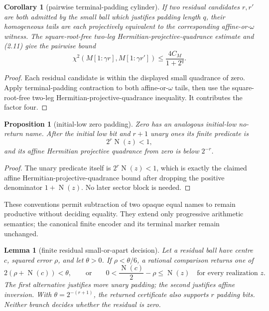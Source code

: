 \documentclass[10pt]{article}
\newtheorem{lemma}[theorem]{Lemma}
\newtheorem{proposition}[theorem]{Proposition}
\newtheorem{corollary}[theorem]{Corollary}
\theoremstyle{definition}
\theoremstyle{remark}
\newcommand{\Norm}{\operatorname{N}}
\newcommand{\Proj}[2]{[#1:#2]}
\begin{document}
\begin{corollary}[pairwise terminal-padding cylinder]
If two residual candidates $r,r'$ are both admitted by the small
ball which justifies padding length $q$, their homogeneous tails are each
projectively equivalent to the corresponding affine-or-$\omega$ witness.
The square-root-free two-leg Hermitian-projective-quadrance estimate and
(2.11) give the pairwise
bound
\[
 \chi^2\!\left(M\Proj{1}{\gamma r},
                 M\Proj{1}{\gamma r'}\right)
 \le \frac{4C_M}{1+2^q}.
\tag{2.11a}
\]
\end{corollary}

\begin{proof}
Each residual candidate is within the displayed small quadrance of zero.
Apply terminal-padding contraction to both affine-or-$\omega$ tails, then use
the square-root-free two-leg Hermitian-projective-quadrance inequality.  It
contributes the factor
four.
\end{proof}

\begin{proposition}[initial-low zero padding]
Zero has an analogous initial-low no-return name.  After the initial low bit
and $r+1$ unary ones its finite predicate is
\[
 2^r\Norm(z)<1,
\]
and its affine Hermitian projective quadrance from zero is below $2^{-r}$.
\end{proposition}

\begin{proof}
The unary predicate itself is $2^r\Norm(z)<1$, which is exactly the claimed
affine Hermitian-projective-quadrance bound after dropping the positive denominator
$1+\Norm(z)$.  No later sector block is needed.
\end{proof}

These conventions permit subtraction of two opaque equal names to remain
productive without deciding equality.  They extend only progressive
arithmetic semantics; the canonical finite encoder and its terminal marker
remain unchanged.

\begin{lemma}[finite residual small-or-apart decision]
\label{lem:residual-small-or-apart}
Let a residual ball have centre $c$, squared error $\rho$, and let
$\theta>0$.  If $\rho<\theta/6$, a rational comparison returns one of
\[
 2(\rho+\Norm(c))<\theta,
 \qquad\text{or}\qquad
 0<\frac{\Norm(c)}2-\rho\le\Norm(z)
 \quad\text{for every realization }z.
\]
The first alternative justifies more unary padding; the second justifies
affine inversion.  With $\theta=2^{-(r+1)}$, the returned certificate also
supports $r$ padding bits.  Neither branch decides whether the residual is
zero.
\end{lemma}
\end{document}
